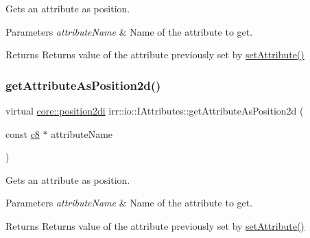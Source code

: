 Gets an attribute as position. 


\begin{DoxyParams}{Parameters}
{\em attribute\+Name} & Name of the attribute to get. \\
\hline
\end{DoxyParams}
\begin{DoxyReturn}{Returns}
Returns value of the attribute previously set by \hyperlink{classirr_1_1io_1_1IAttributes_a03fa31acb481ae23678676cc183f09a6}{set\+Attribute()} 
\end{DoxyReturn}
\mbox{\label{classirr_1_1io_1_1IAttributes_abedde01b678c482be20735e4d730942f}} 
\subsubsection{\texorpdfstring{get\+Attribute\+As\+Position2d()}{getAttributeAsPosition2d()}\hspace{0.1cm}{\footnotesize\ttfamily [2/4]}}
{\footnotesize\ttfamily virtual \hyperlink{namespaceirr_1_1core_ace0f1379db5f9f5660456ec57ab78202}{core\+::position2di} irr\+::io\+::\+I\+Attributes\+::get\+Attribute\+As\+Position2d (\begin{DoxyParamCaption}\item[{const \hyperlink{namespaceirr_a9395eaea339bcb546b319e9c96bf7410}{c8} $\ast$}]{attribute\+Name }\end{DoxyParamCaption})\hspace{0.3cm}{\ttfamily [pure virtual]}}



Gets an attribute as position. 


\begin{DoxyParams}{Parameters}
{\em attribute\+Name} & Name of the attribute to get. \\
\hline
\end{DoxyParams}
\begin{DoxyReturn}{Returns}
Returns value of the attribute previously set by \hyperlink{classirr_1_1io_1_1IAttributes_a03fa31acb481ae23678676cc183f09a6}{set\+Attribute()} 
\end{DoxyReturn}
\mbox{\label{classirr_1_1io_1_1IAttributes_a11afd9cf70fb04706e26ef15a3423d9a}} 
